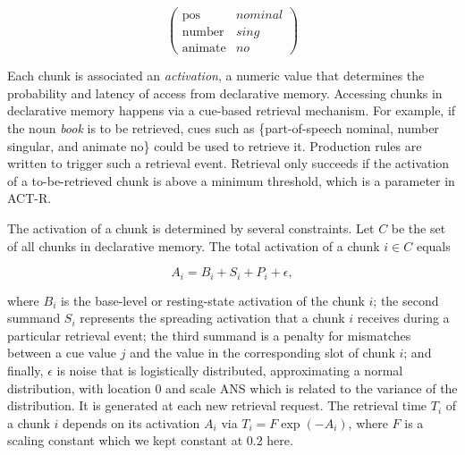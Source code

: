 \documentclass[10pt,letterpaper]{article}
\begin{document}
\begin{equation*}
\begin{pmatrix}
  \text{pos} & \mathit{nominal} \\
  \text{number} & \mathit{sing} \\
  \text{animate} & \mathit{no}
\end{pmatrix}
\end{equation*}

 Each chunk is associated an \emph{activation}, a numeric value that determines the probability and latency of access from declarative memory. Accessing chunks in declarative memory happens via a cue-based retrieval mechanism. For example, if the noun \textit{book} is to be retrieved, cues such as \{part-of-speech nominal, number singular, and animate no\} could be used to retrieve it.  Production rules are written to trigger such a retrieval event. Retrieval only succeeds if the activation of a to-be-retrieved chunk is above a minimum threshold, which is a parameter in ACT-R.

The activation of a chunk is determined by several constraints. 
Let $C$ be the set of all chunks in declarative memory. The total activation of a chunk $i \in C$ equals

\begin{equation}\label{eq:1}
A_i = B_i + S_i + P_i + \epsilon,
\end{equation}

\noindent
where $B_i$ is the base-level or resting-state activation of the chunk $i$; the second summand $S_i$ represents the spreading activation that a chunk $i$ receives during a particular retrieval event; the third summand is a penalty for mismatches between a cue value $j$ and the value in the corresponding slot of chunk $i$; and finally, $\epsilon$ is noise that is logistically distributed, approximating a normal distribution, with location $0$ and scale ANS which is related to the variance of the distribution. It is generated at each new retrieval request.
The retrieval time $T_i$ of a chunk $i$ depends on its activation $A_i$ via $T_i = F \exp(-A_i)$, where $F$ is a scaling constant which we kept constant at $0.2$ here.
\end{document}
